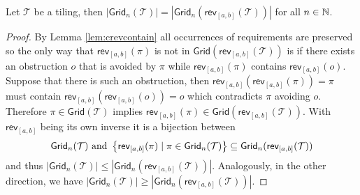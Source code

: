 \begin{proposition}\label{prop:rrtil}
Let $\mathcal{T}$ be a tiling, then $|\textsf{Grid}_n(\mathcal{T})| = |\textsf{Grid}_n(\textsf{rev}_{[a,b]}(\mathcal{T}))|$ for all $n\in\mathbb{N}$.
\end{proposition}
\begin{proof}
By Lemma \ref{lem:crevcontain} all occurrences of requirements are preserved so the only way that $\textsf{rev}_{[a,b]}(\pi)$ is not in $\textsf{Grid}(\textsf{rev}_{[a,b]}(\mathcal{T}))$ is if there exists an obstruction $o$ that is avoided by $\pi$ while $\textsf{rev}_{[a,b]}(\pi)$ contains $\textsf{rev}_{[a,b]}(o)$. Suppose that there is such an obstruction, then $\textsf{rev}_{[a,b]}(\textsf{rev}_{[a,b]}(\pi)) = \pi$ must contain $\textsf{rev}_{[a,b]}(\textsf{rev}_{[a,b]}(o)) = o$ which contradicts $\pi$ avoiding $o$. Therefore $\pi \in \textsf{Grid}(\mathcal{T})$ implies $\textsf{rev}_{[a,b]}(\pi) \in \textsf{Grid}(\textsf{rev}_{[a,b]}(\mathcal{T}))$. With $\textsf{rev}_{[a,b]}$ being its own inverse it is a bijection between
\[
\textsf{Grid}_n(\mathcal{T}) \text{ and } \left\{\textsf{rev}_{[a,b]}(\pi) \mid \pi \in \textsf{Grid}_n(\mathcal{T})\right\} \subseteq \textsf{Grid}_n(\textsf{rev}_{[a,b]}(\mathcal{T}))
\]
and thus $|\textsf{Grid}_n(\mathcal{T})| \leq |\textsf{Grid}_n(\textsf{rev}_{[a,b]}(\mathcal{T}))|$. Analogously, in the other direction, we have $|\textsf{Grid}_n(\mathcal{T})| \geq |\textsf{Grid}_n(\textsf{rev}_{[a,b]}(\mathcal{T}))|$.
\end{proof}